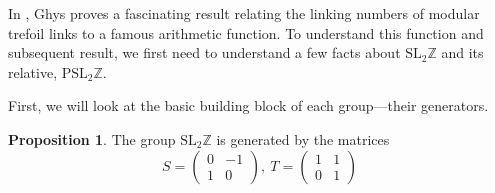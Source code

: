 \documentclass[12pt,twoside]{reedthesis}
\theoremstyle{definition}
\newtheorem{prop}[thm]{Proposition}
\newcommand{\Z}{\mathbb{Z}}
\newcommand{\SLZ}{\mathrm{SL}_2{\Z}}
\newcommand{\PSLZ}{\mathrm{PSL}_2{\Z}}
\begin{document}
In \cite{ghys2007}, Ghys proves a fascinating result relating the linking numbers of modular trefoil links to a famous arithmetic function.
To understand this function and subsequent result, we first need to understand a few facts about $\SLZ$ and its relative, $\PSLZ$.

First, we will look at the basic building block of each group---their generators.

\begin{prop}
  The group $\SLZ$ is generated by the matrices
  \begin{equation*}
    S = \begin{pmatrix}
      0 & -1 \\
      1 & 0
    \end{pmatrix},\
    T = \begin{pmatrix}
      1 & 1 \\
      0 & 1
    \end{pmatrix}
  \end{equation*}
\end{prop}
\end{document}
